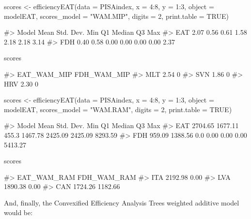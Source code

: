 \begin{Schunk}
\begin{Sinput}
scores <- efficiencyEAT(data = PISAindex, x = 4:8, y = 1:3, object = modelEAT, 
                        scores_model = "WAM.MIP", digits = 2,
                        print.table = TRUE)
\end{Sinput}
\begin{Soutput}
#>  Model Mean Std. Dev.  Min   Q1 Median   Q3  Max
#>    EAT 2.07      0.56 0.61 1.58   2.18 2.18 3.14
#>    FDH 0.40      0.58 0.00 0.00   0.00 0.00 2.37
\end{Soutput}
\begin{Sinput}
scores %>% sample_n(3)
\end{Sinput}
\begin{Soutput}
#>     EAT_WAM_MIP FDH_WAM_MIP
#> MLT        2.54           0
#> SVN        1.86           0
#> HRV        2.30           0
\end{Soutput}
\end{Schunk}

\begin{Schunk}
\begin{Sinput}
scores <- efficiencyEAT(data = PISAindex, x = 4:8, y = 1:3, object = modelEAT,
                        scores_model = "WAM.RAM", digits = 2,
                        print.table = TRUE)
\end{Sinput}
\begin{Soutput}
#>  Model    Mean Std. Dev.   Min      Q1  Median      Q3     Max
#>    EAT 2704.65   1677.11 455.3 1467.78 2425.09 2425.09 8293.59
#>    FDH  959.09   1388.56   0.0    0.00    0.00    0.00 5413.27
\end{Soutput}
\begin{Sinput}
scores %>% sample_n(3)
\end{Sinput}
\begin{Soutput}
#>     EAT_WAM_RAM FDH_WAM_RAM
#> ITA     2192.98        0.00
#> LVA     1890.38        0.00
#> CAN     1724.26     1182.66
\end{Soutput}
\end{Schunk}

And, finally, the Convexified Efficiency Analysis Trees weighted
additive model would be:

